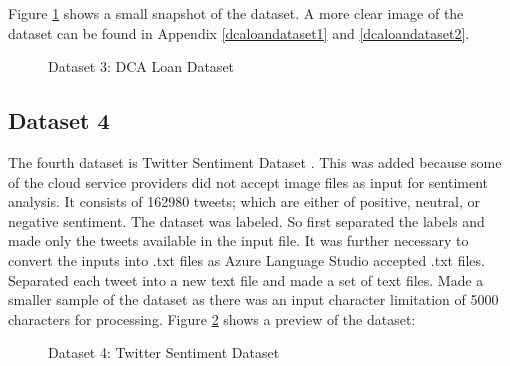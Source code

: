 Figure \ref{dcaloandataset} shows a small snapshot of the dataset. A more clear image of the dataset can be found in Appendix \ref{dcaloandataset1} and \ref{dcaloandataset2}.
\begin {figure}[ht]
\centering
{}
\caption{Dataset 3: \acs{DCA} Loan Dataset}
\label{dcaloandataset}
\end {figure}

\newpage
\subsection{Dataset 4} \label{subsection:data4}
The fourth dataset is Twitter Sentiment Dataset \cite{sentikaggle}. This was added because some of the cloud service providers did not accept image files as input for sentiment analysis. It consists of 162980 tweets; which are either of positive, neutral, or negative sentiment. The dataset was labeled. So first separated the labels and made only the tweets available in the input file. It was further necessary to convert the inputs into .txt files as Azure Language Studio accepted .txt files. Separated each tweet into a new text file and made a set of text files. Made a smaller sample of the dataset as there was an input character limitation of 5000 characters for processing. Figure \ref{sentidataset} shows a preview of the dataset:
\begin {figure}[ht]
\centering
{}
\caption{Dataset 4: Twitter Sentiment Dataset}
\label{sentidataset}
\end {figure}

